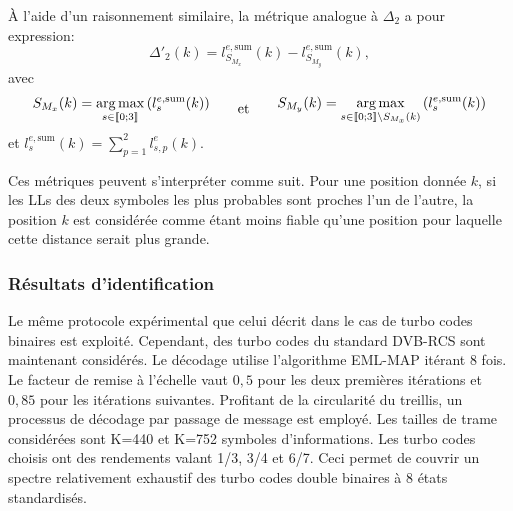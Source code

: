 À l'aide d'un raisonnement similaire, la métrique analogue à $\Delta_2$ a pour expression: 
\begin{equation}
	\Delta'_2(k) = l^{e,\text{sum}}_{S_{M_x}}(k)-l^{e,\text{sum}}_{S_{M_y}}(k),
\end{equation}
avec
\begin{equation*}	\begin{split}
	S_{M_x}(k) = \operatorname*{arg\,max}\limits_{s\in\llbracket0;3\rrbracket}\left(l^{e,\text{sum}}_s(k)\right)
	\end{split}\qquad\text{et}\qquad
	\begin{split}
		S_{M_y}(k) = \operatorname*{arg\,max}\limits_{s\in\llbracket0;3\rrbracket\setminus{S_{M_x}(k)}}\left(l^{e,\text{sum}}_s(k)\right)
	\end{split} 
\end{equation*}
et $l^{e,\text{sum}}_s(k) = \sum\limits_{p=1}^2l^e_{s,p}(k)$.

Ces métriques peuvent s'interpréter comme suit. Pour une position donnée $k$, si les LLs des deux symboles les 
plus probables sont proches l'un de l'autre, la position $k$ est considérée comme étant moins fiable qu'une position pour
laquelle cette distance serait plus grande.

\subsubsection{Résultats d'identification}
Le même protocole expérimental que celui décrit dans le cas de turbo codes binaires est exploité. Cependant, des turbo codes du standard DVB-RCS
sont maintenant considérés. Le décodage utilise l'algorithme EML-MAP itérant 8 fois. Le facteur de remise à l'échelle 
vaut $0,5$ pour les deux premières itérations et $0,85$ pour les itérations suivantes. Profitant de la circularité du treillis, 
un processus de décodage par passage de message est employé. Les tailles de trame considérées sont K=440
et K=752 symboles d'informations. Les turbo codes choisis ont des rendements valant 1/3, 3/4 et 6/7. Ceci permet de 
couvrir un spectre relativement exhaustif des turbo codes double binaires à 8 états standardisés. 

